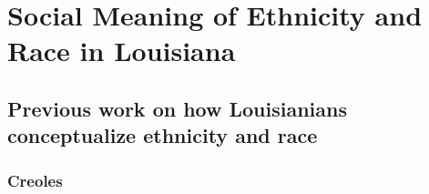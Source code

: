 \chapter{Social Meaning of Ethnicity and Race in Louisiana}
  \section{Previous work on how Louisianians conceptualize ethnicity and race}
    \subsection{Creoles}
